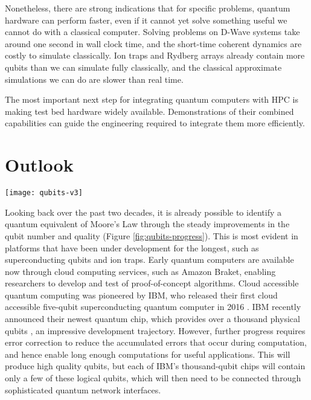 \documentclass[10pt]{iopart}
\begin{document}
Nonetheless, there are strong indications that for specific problems, quantum hardware can perform faster, even if it cannot yet solve something useful we cannot do with a classical computer. Solving problems on D-Wave systems take around one second in wall clock time, and the short-time coherent dynamics \cite{King2022} are costly to simulate classically.  Ion traps and Rydberg arrays already contain more qubits than we can simulate fully classically, and the classical approximate simulations we can do are slower than real time.

The most important next step for integrating quantum computers with HPC is making test bed hardware widely available. Demonstrations of their combined capabilities can guide the engineering required to integrate them more efficiently.



\section{Outlook}\label{sec:outlook}

\begin{figure*}[ht!]
\centering
\texttt{[image: qubits-v3]}
\caption{Growth in number of qubits per device from 1998 to 2024. Showing SC circuits (red $\times$), trapped ions (green $+$), cold atoms (blue stars), NMR (orange squares) and silicon/spin (pink diamonds) platforms. Results from selected teams annotated with team name and circled in grey. Compiled by R. Au-Yeung from Statista \cite{Statista} and press releases.}
\label{fig:qubits-progress}
\end{figure*}

Looking back over the past two decades, it is already possible to identify a quantum equivalent of Moore's Law through the steady improvements in the qubit number and quality (Figure \ref{fig:qubits-progress}). This is most evident in platforms that have been under development for the longest, such as superconducting qubits and ion traps. Early quantum computers are available now through cloud computing services, such as Amazon Braket, enabling researchers to develop and test of proof-of-concept algorithms. Cloud accessible quantum computing was pioneered by IBM, who released their first cloud accessible five-qubit superconducting quantum computer in 2016 \cite{Mandelbaum2021}. IBM recently announced their newest quantum chip, which provides over a thousand physical qubits \cite{Castelvecchi2023}, an impressive development trajectory.  However, further progress requires error correction \cite{Roffe2019} to reduce the accumulated errors that occur during computation, and hence enable long enough computations for useful applications. This will produce high quality qubits, but each of IBM's thousand-qubit chips will contain only a few of these logical qubits, which will then need to be connected through sophisticated quantum network interfaces.
\end{document}
